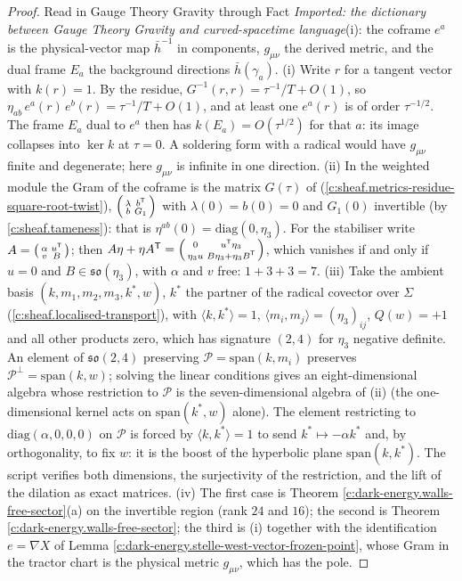 \documentclass[11pt]{article}
\theoremstyle{definition}
\theoremstyle{plain}
\providecommand{\hb}{}\renewcommand{\hb}{\bar{h}}
\providecommand{\ip}{}\renewcommand{\ip}[2]{\langle #1, #2\rangle}
\begin{document}
\begin{proof}
Read in Gauge Theory Gravity through Fact \emph{Imported: the dictionary between Gauge Theory Gravity and curved-spacetime language}(i): the coframe $e^a$ is the physical-vector map $\hb^{-1}$ in components, $g_{\mu\nu}$ the derived metric, and the dual frame $E_a$ the background directions $\hb(\gamma_a)$. (i) Write $r$ for a tangent vector with $k(r) = 1$. By the residue, $G^{-1}(r, r) = \tau^{-1}/T + O(1)$, so $\eta_{ab}\,e^a(r)\,e^b(r) = \tau^{-1}/T + O(1)$, and at least one $e^a(r)$ is of order $\tau^{-1/2}$. The frame $E_a$ dual to $e^a$ then has $k(E_a) = O(\tau^{1/2})$ for that $a$: its image collapses into $\ker k$ at $\tau = 0$. A soldering form with a radical would have $g_{\mu\nu}$ finite and degenerate; here $g_{\mu\nu}$ is infinite in one direction. (ii) In the weighted module the Gram of the coframe is the matrix $G(\tau)$ of \cite[proof of Thm.~6.2]{ButlerT4} (\ref{c:sheaf.metrics-residue-square-root-twist}), $\begin{psmallmatrix}\lambda & b^{\mathsf T}\\ b & G_1\end{psmallmatrix}$ with $\lambda(0) = b(0) = 0$ and $G_1(0)$ invertible (by \ref{c:sheaf.tameness}): that is $\eta^{ab}(0) = \mathrm{diag}(0, \eta_3)$. For the stabiliser write $A = \begin{psmallmatrix}\alpha & u^{\mathsf T}\\ v & B\end{psmallmatrix}$; then $A\eta + \eta A^{\mathsf T} = \begin{psmallmatrix} 0 & u^{\mathsf T}\eta_3\\ \eta_3 u & B\eta_3 + \eta_3 B^{\mathsf T}\end{psmallmatrix}$, which vanishes if and only if $u = 0$ and $B \in \mathfrak{so}(\eta_3)$, with $\alpha$ and $v$ free: $1 + 3 + 3 = 7$. (iii) Take the ambient basis $(k, m_1, m_2, m_3, k^*, w)$, $k^*$ the partner of the radical covector over $\Sigma$ (\ref{c:sheaf.localised-transport}), with $\ip{k}{k^*} = 1$, $\ip{m_i}{m_j} = (\eta_3)_{ij}$, $Q(w) = +1$ and all other products zero, which has signature $(2,4)$ for $\eta_3$ negative definite. An element of $\mathfrak{so}(2,4)$ preserving $\mathcal{P} = \mathrm{span}(k, m_i)$ preserves $\mathcal{P}^\perp = \mathrm{span}(k, w)$; solving the linear conditions gives an eight-dimensional algebra whose restriction to $\mathcal{P}$ is the seven-dimensional algebra of (ii) (the one-dimensional kernel acts on $\mathrm{span}(k^*, w)$ alone). The element restricting to $\mathrm{diag}(\alpha, 0, 0, 0)$ on $\mathcal{P}$ is forced by $\ip{k}{k^*} = 1$ to send $k^* \mapsto -\alpha k^*$ and, by orthogonality, to fix $w$: it is the boost of the hyperbolic plane $\mathrm{span}(k, k^*)$. The script verifies both dimensions, the surjectivity of the restriction, and the lift of the dilation as exact matrices. (iv) The first case is Theorem \ref{c:dark-energy.walls-free-sector}(a) on the invertible region (rank $24$ and $16$); the second is Theorem \ref{c:dark-energy.walls-free-sector}; the third is (i) together with the identification $e = \nabla X$ of Lemma \ref{c:dark-energy.stelle-west-vector-frozen-point}, whose Gram in the tractor chart is the physical metric $g_{\mu\nu}$, which has the pole.


\end{proof}
\end{document}
